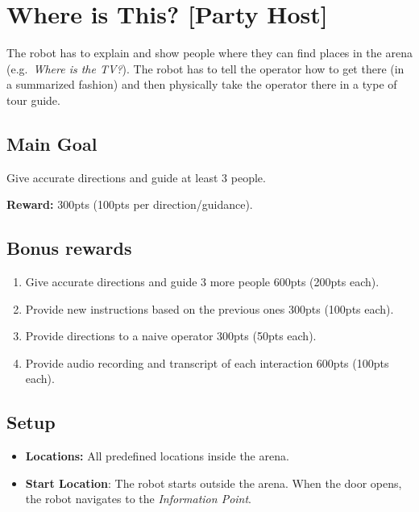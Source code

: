 \section{Where is This? [Party Host]}
\label{test:where-is-this}
The robot has to explain and show people where they can find places in the arena (e.g.~\emph{Where is the TV?}). The robot has to tell the operator how to get there (in a summarized fashion) and then physically take the operator there in a type of tour guide.


\subsection*{Main Goal}
Give accurate directions and guide at least 3 people.

\noindent\textbf{Reward:} 300pts (100pts per direction/guidance).

\subsection*{Bonus rewards}
\begin{enumerate}[nosep]
	\item Give accurate directions and guide 3 more people 600pts (200pts each).
	\item Provide new instructions based on the previous ones 300pts (100pts each).
	\item Provide directions to a naive operator 300pts (50pts each).
	\item Provide audio recording and transcript of each interaction 600pts (100pts each).
\end{enumerate}

\subsection*{Setup}
\begin{itemize}[nosep]
	\item \textbf{Locations:} All predefined locations inside the arena.

	\item \textbf{Start Location}: The robot starts outside the arena. When the door opens, the robot navigates to the \emph{Information Point}.
\end{itemize}

